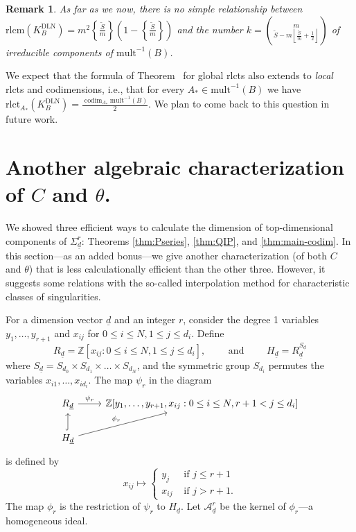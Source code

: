 \documentclass[a4paper]{amsart}
\DeclareMathOperator{\codim}{\mathrm{codim}}
\newcommand{\Hh}{H}
\newcommand{\Rr}{R}
\newcommand{\Z}{\mathbb{Z}}
\newcommand{\CA}{\mathcal{A}}
\newcommand{\ud}{\underline{d}}
\newcommand{\rlct}{\mathrm{rlct}}
\newcommand{\rlcm}{\mathrm{rlcm}}
\newcommand{\DLN}{\mathrm{DLN}}
\newcommand{\mult}{\mathrm{mult}}
\theoremstyle{plain}
\newtheorem{remark}[thm]{Remark}
\begin{document}
\begin{remark} \rm
As far as we now, there is no simple relationship between $\rlcm(K^{\DLN}_B)=m^2\left\{\frac{\tilde{S}}{m} \right\}\left(1-\left\{\frac{\tilde{S}}{m} \right\}\right)$ and the number $k=\binom{m}{\tilde{S}-m\left\lfloor \frac{\tilde{S}}{m}+\frac{1}{2}\right\rfloor}$ of irreducible components of $\mult^{-1}(B)$.
\end{remark}

We expect that the formula of Theorem~\label{thm:aoyagi-rlct} for global rlcts also extends to \emph{local} rlcts and codimensions, i.e., that for every $A_*\in \mult^{-1}(B)$ we have $\rlct_{A_*}(K^{\DLN}_B)=\frac{\codim_{A_*} \mult^{-1}(B)}{2}.$ We plan to come back to this question in future work.

\appendix

\section{Another algebraic characterization of $C$ and $\theta$.} \label{sec:app_theta}


We showed three efficient ways to calculate the dimension of top-dimensional components of $\Sigma^r_{\ud}$: Theorems \ref{thm:Pseries}, \ref{thm:QIP}, and \ref{thm:main-codim}. In this section---as an added bonus---we give another characterization (of both $C$ and $\theta$) that is less calculationally efficient than the other three. However, it suggests some relations with the so-called interpolation method for characteristic classes of singularities.

For a dimension vector $\ud$ and an integer $r$, consider the degree 1 variables $y_1,\ldots,y_{r+1}$ and $x_{ij}$ for $0\leq i \leq N, 1\leq j \leq d_i$. 
Define 
\[\Rr_{\ud}=\Z[x_{ij}: 0\leq i \leq N, 1\leq j \leq d_i],
\qquad\text{ and }\qquad 
\Hh_{\ud}= \Rr_{\ud}^{S_{\ud}}
\]
where $S_{\ud}=S_{d_0}\times S_{d_1}\times \ldots \times S_{d_N}$, and the symmetric group $S_{d_i}$ permutes the variables $x_{i1},\ldots,x_{id_i}$.  
The map $\psi_r$ in the diagram
\[
\begin{tikzcd}
\Rr_{\ud} \arrow[r, "\psi_r"] &
\Z[y_1,\ldots,y_{r+1}, x_{ij}: 0\leq i \leq N, r+1< j \leq d_i] \\
\Hh_{\ud} \arrow[u, hook] \arrow[ru, "\phi_r"] & 
\end{tikzcd}
\]
is defined by 
\[
x_{ij}\mapsto 
\begin{cases}
    y_j & \text{ if } j\leq r+1\\
    x_{ij} & \text{ if } j>r+1.
\end{cases}
\]
The map $\phi_r$ is the restriction of $\psi_r$ to $\Hh_{\ud}$. Let $\CA^r_{\ud}$ be the kernel of $\phi_r$---a homogeneous ideal.
\end{document}
